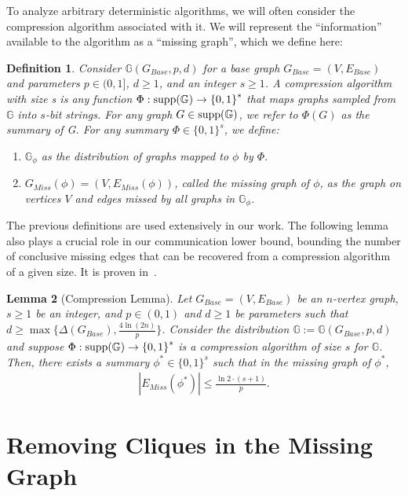 \documentclass[11pt]{article}
\newtheorem{lemma}{Lemma}[section]
\newtheorem{definition}[lemma]{Definition}
\theoremstyle{definition}
\renewcommand{\leq}{\leqslant}
\renewcommand{\geq}{\geqslant}
\renewcommand{\le}{\leq}
\renewcommand{\ge}{\geq}
\newcommand{\supp}[1]{\ensuremath{\textnormal{\text{supp}}(#1)}}
\begin{document}
To analyze arbitrary deterministic algorithms, we will often consider the compression algorithm associated with it. We will represent the ``information'' available to the algorithm as a ``missing graph'', which we define here:
\begin{definition}
    Consider $\mathbb{G}(G_{Base}, p, d)$ for a base graph $G_{Base}=(V, E_{Base})$ and parameters $p\in(0, 1]$, $d\ge 1$, and an integer $s\ge 1$. A compression algorithm with size s is any function $\Phi : \supp{\mathbb{G}} \rightarrow {\{0, 1\}}^s$ that maps graphs sampled from $\mathbb{G}$ into $s$-bit strings. For any graph $G\in \supp{\mathbb{G}}$, we refer to $\Phi(G)$ as the summary of G. For any summary $\Phi\in{\{0,1\}}^s$, we define:
    \begin{enumerate}
        \item $\mathbb{G}_{\phi}$ as the distribution of graphs mapped to $\phi$ by $\Phi$. 
        \item $G_{Miss}(\phi)=(V, E_{Miss}(\phi))$, called the missing graph of $\phi$, as the graph on vertices $V$ and edges missed by all graphs in $\mathbb{G}_{\phi}$. 
    \end{enumerate}
\end{definition}

The previous definitions are used extensively in our work. The following lemma also plays a crucial role in our communication lower bound, bounding the number of conclusive missing edges that can be recovered from a compression algorithm of a given size. It is proven in~\cite{assadi2022deterministic}.

\begin{lemma}[Compression Lemma]\label{compression}
Let $G_{Base}=(V, E_{Base})$ be an $n$-vertex graph, $s\ge 1$ be an integer, and $p\in (0, 1)$ and $d\ge 1$ be parameters such that $d\ge \max\{\Delta{(G_{Base})}, \frac {4\ln(2n)}p\}$. Consider the distribution $\mathbb{G}:=\mathbb{G}(G_{Base}, p, d)$ and suppose $\Phi:\supp{\mathbb{G}}\rightarrow {\{0, 1\}}^s$ is a compression algorithm of size $s$ for $\mathbb{G}$. Then, there exists a summary $\phi^*\in {\{0, 1\}}^s$ such that in the missing graph of $\phi^*$,
\begin{align*}
    |E_{Miss}(\phi^*)|\le \frac{\ln 2\cdot (s+1)}p.
\end{align*}
\end{lemma}
\section{Removing Cliques in the Missing Graph}
\end{document}
